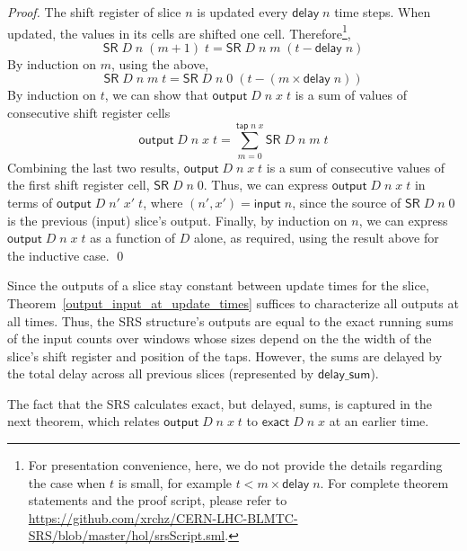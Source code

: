 \documentclass{llncs}
\begin{document}
\begin{proof}
The shift register of slice $n$ is updated every $\mathsf{delay}\;n$ time steps.
When updated, the values in its cells are shifted one cell.
Therefore\footnote{For presentation convenience, here, we do not provide the details regarding the case when $t$ is small, for example $t<m\times\mathsf{delay}\;n$.
For complete theorem statements and the proof script, please refer to \url{https://github.com/xrchz/CERN-LHC-BLMTC-SRS/blob/master/hol/srsScript.sml}.},
\begin{equation*}
\mathsf{SR}\;D\;n\;(m+1)\;t=\mathsf{SR}\;D\;n\;m\;(t-\mathsf{delay}\;n)
\end{equation*}
By induction on $m$, using the above,
\begin{equation*}
\mathsf{SR}\;D\;n\;m\;t=\mathsf{SR}\;D\;n\;0\;(t-(m\times\mathsf{delay}\;n))
\end{equation*}
By induction on $t$, we can show that $\mathsf{output}\;D\;n\;x\;t$ is a sum of values of consecutive shift register cells
\begin{equation*}
\mathsf{output}\;D\;n\;x\;t=\sum_{m=0}^{\mathsf{tap}\;n\;x}\mathsf{SR}\;D\;n\;m\;t
\end{equation*}
Combining the last two results, $\mathsf{output}\;D\;n\;x\;t$ is a sum of consecutive values of the first shift register cell, $\mathsf{SR}\;D\;n\;0$.
Thus, we can express $\mathsf{output}\;D\;n\;x\;t$ in terms of $\mathsf{output}\;D\;n'\;x'\;t$, where $(n',x')=\mathsf{input}\;n$, since the source of $\mathsf{SR}\;D\;n\;0$ is the previous (input) slice's output.
Finally, by induction on $n$, we can express $\mathsf{output}\;D\;n\;x\;t$ as a function of $D$ alone, as required, using the result above for the inductive case.
\qed
\end{proof}

Since the outputs of a slice stay constant between update times for the slice, Theorem~\ref{output_input_at_update_times} suffices to characterize all outputs at all times.
Thus, the SRS structure's outputs are equal to the exact running sums of the input counts over windows whose sizes depend on the the width of the slice's shift register and position of the taps.
However, the sums are delayed by the total delay across all previous slices (represented by $\mathsf{delay\_sum}$).

The fact that the SRS calculates exact, but delayed, sums, is captured in the next theorem, which relates $\mathsf{output}\;D\;n\;x\;t$ to $\mathsf{exact}\;D\;n\;x$ at an earlier time.
\end{document}
